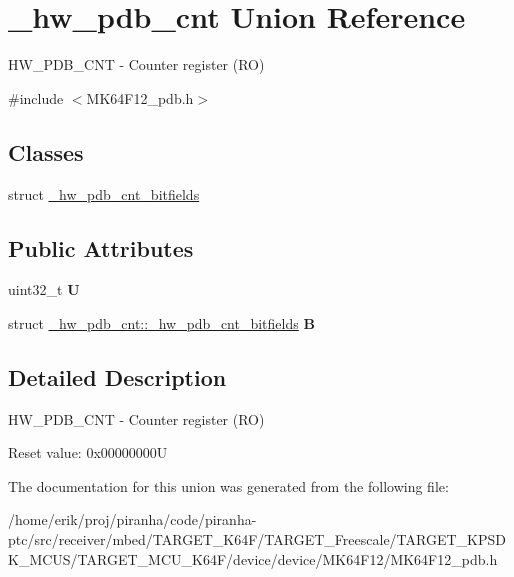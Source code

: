 \hypertarget{union__hw__pdb__cnt}{}\section{\+\_\+hw\+\_\+pdb\+\_\+cnt Union Reference}
\label{union__hw__pdb__cnt}


H\+W\+\_\+\+P\+D\+B\+\_\+\+C\+NT -\/ Counter register (RO)  




{\ttfamily \#include $<$M\+K64\+F12\+\_\+pdb.\+h$>$}

\subsection*{Classes}
\begin{DoxyCompactItemize}
\item 
struct \hyperlink{struct__hw__pdb__cnt_1_1__hw__pdb__cnt__bitfields}{\+\_\+hw\+\_\+pdb\+\_\+cnt\+\_\+bitfields}
\end{DoxyCompactItemize}
\subsection*{Public Attributes}
\begin{DoxyCompactItemize}
\item 
uint32\+\_\+t {\bfseries U}\hypertarget{union__hw__pdb__cnt_a967fa2b22e2959840d6b6d1714265498}{}\label{union__hw__pdb__cnt_a967fa2b22e2959840d6b6d1714265498}

\item 
struct \hyperlink{struct__hw__pdb__cnt_1_1__hw__pdb__cnt__bitfields}{\+\_\+hw\+\_\+pdb\+\_\+cnt\+::\+\_\+hw\+\_\+pdb\+\_\+cnt\+\_\+bitfields} {\bfseries B}\hypertarget{union__hw__pdb__cnt_a4d9d58c892a24662a3559a7f999ca8cb}{}\label{union__hw__pdb__cnt_a4d9d58c892a24662a3559a7f999ca8cb}

\end{DoxyCompactItemize}


\subsection{Detailed Description}
H\+W\+\_\+\+P\+D\+B\+\_\+\+C\+NT -\/ Counter register (RO) 

Reset value\+: 0x00000000U 

The documentation for this union was generated from the following file\+:\begin{DoxyCompactItemize}
\item 
/home/erik/proj/piranha/code/piranha-\/ptc/src/receiver/mbed/\+T\+A\+R\+G\+E\+T\+\_\+\+K64\+F/\+T\+A\+R\+G\+E\+T\+\_\+\+Freescale/\+T\+A\+R\+G\+E\+T\+\_\+\+K\+P\+S\+D\+K\+\_\+\+M\+C\+U\+S/\+T\+A\+R\+G\+E\+T\+\_\+\+M\+C\+U\+\_\+\+K64\+F/device/device/\+M\+K64\+F12/M\+K64\+F12\+\_\+pdb.\+h\end{DoxyCompactItemize}
